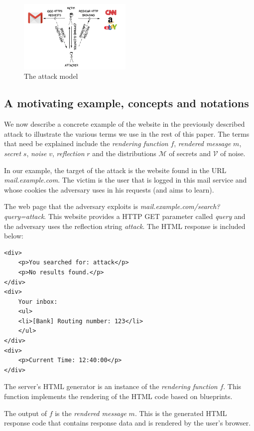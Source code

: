 \documentclass[conference, letterpaper, 10pt]{IEEEtran}
\begin{document}
    \begin{figure}[thpb]
        \centering
            \includegraphics[width=0.48\textwidth]{attack_model.png}
        \caption{The attack model}
        \label{fig:attack_model}
    \end{figure}

\subsection{A motivating example, concepts and notations}\label{subsec:terms}
We now describe a concrete example of the website in the previously described
attack to illustrate the various terms we use in the rest of this paper.  The
terms that need be explained include the \textit{rendering function} $f$,
\textit{rendered message} $m$, \textit{secret} $s$, \textit{noise} $v$,
\textit{reflection} $r$ and the distributions $\mathcal{M}$ of secrets and
$\mathcal{V}$ of noise.

In our example, the target of the attack is the website found in the URL
\textit{mail.example.com}. The victim is the user that is logged in this mail
service and whose cookies the adversary uses in his requests (and aims to learn).

The web page that the adversary exploits is
\textit{mail.example.com/search?query=attack}. This website provides a HTTP GET
parameter called \textit{query} and the adversary uses the reflection string
\textit{attack}. The HTML response is included below:

\begin{lstlisting}[basicstyle=\small\ttfamily]
<div>
    <p>You searched for: attack</p>
    <p>No results found.</p>
</div>
<div>
    Your inbox:
    <ul>
    <li>[Bank] Routing number: 123</li>
    </ul>
</div>
<div>
    <p>Current Time: 12:40:00</p>
</div>
\end{lstlisting}

The server's HTML generator is an instance of the \textit{rendering function}
$f$. This function implements the rendering of the HTML code based on
blueprints.

The output of $f$ is the \textit{rendered message} $m$. This is the generated
HTML response code that contains response data and is rendered by the user's
browser.
\end{document}
